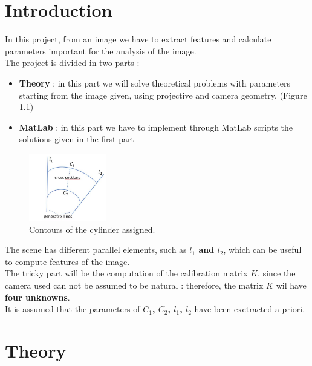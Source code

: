 \documentclass[a4paper, 11pt, oneside, openright, english]{book}
\begin{document}
\chapter{Introduction}
In this project, from an image we have to extract features and calculate parameters important for the analysis of the image.\\
The project is divided in two parts : 
\begin{itemize}
    \item \textbf{Theory} : in this part we will solve theoretical problems with parameters starting from the image given, using projective and camera geometry. (Figure \ref{fig:contours})
    \item \textbf{MatLab} : in this part we have to implement through MatLab scripts the solutions given in the first part
\end{itemize}
\begin{figure}[H]
    \centering
    \includegraphics[width=0.3\textwidth]{../images/contours.JPG}
    \caption{Contours of the cylinder assigned.}
    \label{fig:contours}    
\end{figure}
The scene has different parallel elements, such as \textbf{$l_1$ and $l_2$}, which can be useful to compute features of the image.\\
The tricky part will be the computation of the calibration matrix \textbf{$K$}, since the camera used can not be assumed to be natural : 
therefore, the matrix $K$ wil have \textbf{four unknowns}.\\
It is assumed that the parameters of \textbf{$C_1$, $C_2$, $l_1$, $l_2$} have been exctracted a priori.\\
\chapter{Theory}
\end{document}
